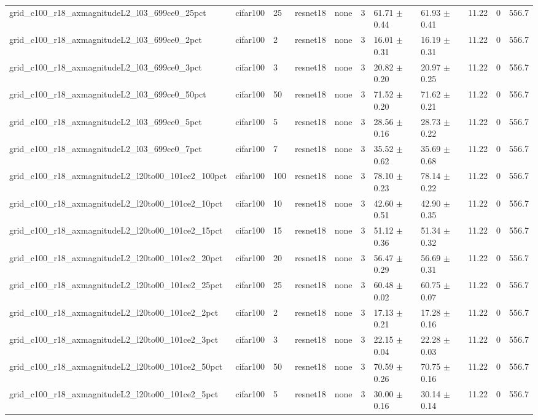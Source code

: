 \begin{tabular}{lllllllllll}
grid_c100_r18_axmagnitudeL2_l03_699ce0_25pct & cifar100 & 25 & resnet18 & none & 3 & 61.71 $\pm$ 0.44 & 61.93 $\pm$ 0.41 & 11.22 & 0 & 556.7 \\
grid_c100_r18_axmagnitudeL2_l03_699ce0_2pct & cifar100 & 2 & resnet18 & none & 3 & 16.01 $\pm$ 0.31 & 16.19 $\pm$ 0.31 & 11.22 & 0 & 556.7 \\
grid_c100_r18_axmagnitudeL2_l03_699ce0_3pct & cifar100 & 3 & resnet18 & none & 3 & 20.82 $\pm$ 0.20 & 20.97 $\pm$ 0.25 & 11.22 & 0 & 556.7 \\
grid_c100_r18_axmagnitudeL2_l03_699ce0_50pct & cifar100 & 50 & resnet18 & none & 3 & 71.52 $\pm$ 0.20 & 71.62 $\pm$ 0.21 & 11.22 & 0 & 556.7 \\
grid_c100_r18_axmagnitudeL2_l03_699ce0_5pct & cifar100 & 5 & resnet18 & none & 3 & 28.56 $\pm$ 0.16 & 28.73 $\pm$ 0.22 & 11.22 & 0 & 556.7 \\
grid_c100_r18_axmagnitudeL2_l03_699ce0_7pct & cifar100 & 7 & resnet18 & none & 3 & 35.52 $\pm$ 0.62 & 35.69 $\pm$ 0.68 & 11.22 & 0 & 556.7 \\
grid_c100_r18_axmagnitudeL2_l20to00_101ce2_100pct & cifar100 & 100 & resnet18 & none & 3 & 78.10 $\pm$ 0.23 & 78.14 $\pm$ 0.22 & 11.22 & 0 & 556.7 \\
grid_c100_r18_axmagnitudeL2_l20to00_101ce2_10pct & cifar100 & 10 & resnet18 & none & 3 & 42.60 $\pm$ 0.51 & 42.90 $\pm$ 0.35 & 11.22 & 0 & 556.7 \\
grid_c100_r18_axmagnitudeL2_l20to00_101ce2_15pct & cifar100 & 15 & resnet18 & none & 3 & 51.12 $\pm$ 0.36 & 51.34 $\pm$ 0.32 & 11.22 & 0 & 556.7 \\
grid_c100_r18_axmagnitudeL2_l20to00_101ce2_20pct & cifar100 & 20 & resnet18 & none & 3 & 56.47 $\pm$ 0.29 & 56.69 $\pm$ 0.31 & 11.22 & 0 & 556.7 \\
grid_c100_r18_axmagnitudeL2_l20to00_101ce2_25pct & cifar100 & 25 & resnet18 & none & 3 & 60.48 $\pm$ 0.02 & 60.75 $\pm$ 0.07 & 11.22 & 0 & 556.7 \\
grid_c100_r18_axmagnitudeL2_l20to00_101ce2_2pct & cifar100 & 2 & resnet18 & none & 3 & 17.13 $\pm$ 0.21 & 17.28 $\pm$ 0.16 & 11.22 & 0 & 556.7 \\
grid_c100_r18_axmagnitudeL2_l20to00_101ce2_3pct & cifar100 & 3 & resnet18 & none & 3 & 22.15 $\pm$ 0.04 & 22.28 $\pm$ 0.03 & 11.22 & 0 & 556.7 \\
grid_c100_r18_axmagnitudeL2_l20to00_101ce2_50pct & cifar100 & 50 & resnet18 & none & 3 & 70.59 $\pm$ 0.26 & 70.75 $\pm$ 0.16 & 11.22 & 0 & 556.7 \\
grid_c100_r18_axmagnitudeL2_l20to00_101ce2_5pct & cifar100 & 5 & resnet18 & none & 3 & 30.00 $\pm$ 0.16 & 30.14 $\pm$ 0.14 & 11.22 & 0 & 556.7 \\

\end{tabular}
